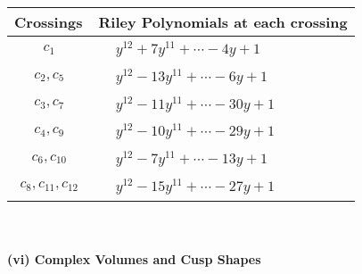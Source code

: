 \documentclass[1p]{elsarticle_modified}
\theoremstyle{definition}
\begin{document}
\begin{tabular}{m{50pt}|m{274pt}}
Crossings & \hspace{64pt}Riley Polynomials at each crossing \\
\hline $$\begin{aligned}c_{1}\end{aligned}$$&$\begin{aligned}
&y^{12}+7 y^{11}+\cdots-4 y+1
\end{aligned}$\\
\hline $$\begin{aligned}c_{2},c_{5}\end{aligned}$$&$\begin{aligned}
&y^{12}-13 y^{11}+\cdots-6 y+1
\end{aligned}$\\
\hline $$\begin{aligned}c_{3},c_{7}\end{aligned}$$&$\begin{aligned}
&y^{12}-11 y^{11}+\cdots-30 y+1
\end{aligned}$\\
\hline $$\begin{aligned}c_{4},c_{9}\end{aligned}$$&$\begin{aligned}
&y^{12}-10 y^{11}+\cdots-29 y+1
\end{aligned}$\\
\hline $$\begin{aligned}c_{6},c_{10}\end{aligned}$$&$\begin{aligned}
&y^{12}-7 y^{11}+\cdots-13 y+1
\end{aligned}$\\
\hline $$\begin{aligned}c_{8},c_{11},c_{12}\end{aligned}$$&$\begin{aligned}
&y^{12}-15 y^{11}+\cdots-27 y+1
\end{aligned}$\\
\hline
\end{tabular}\\~\\
\newpage\flushleft \textbf{(vi) Complex Volumes and Cusp Shapes}
\end{document}
